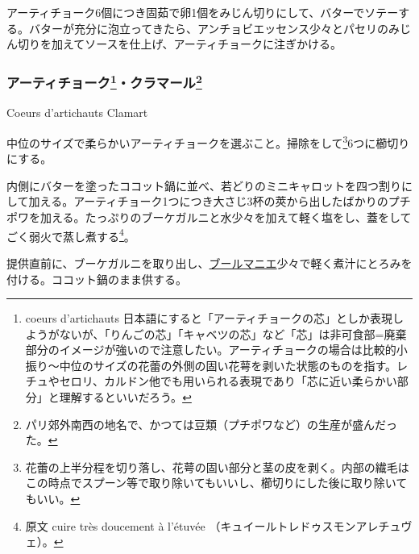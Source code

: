 \begin{recette}
アーティチョーク6個につき固茹で卵1個をみじん切りにして、バターでソテーする。バターが充分に泡立ってきたら、アンチョビエッセンス少々とパセリのみじん切りを加えてソースを仕上げ、アーティチョークに注ぎかける。

\atoaki{}

\hypertarget{coeurs-d-artichauts-clamart}{%
\subsubsection[アーティチョーク・クラマール]{\texorpdfstring{アーティチョーク\footnote{coeurs
  d'artichauts
  日本語にすると「アーティチョークの芯」としか表現しようがないが、「りんごの芯」「キャベツの芯」など「芯」は非可食部=廃棄部分のイメージが強いので注意したい。アーティチョークの場合は比較的小振り〜中位のサイズの花蕾の外側の固い花萼を剥いた状態のものを指す。レチュやセロリ、カルドン他でも用いられる表現であり「芯に近い柔らかい部分」と理解するといいだろう。}・クラマール\footnote{パリ郊外南西の地名で、かつては豆類（プチポワなど）の生産が盛んだった。}}{アーティチョーク・クラマール}}\label{coeurs-d-artichauts-clamart}}

\begin{frsubenv}

Coeurs d'artichauts Clamart

\end{frsubenv}


中位のサイズで柔らかいアーティチョークを選ぶこと。掃除をして\footnote{花蕾の上半分程を切り落し、花萼の固い部分と茎の皮を剥く。内部の繊毛はこの時点でスプーン等で取り除いてもいいし、櫛切りにした後に取り除いてもいい。}6つに櫛切りにする。

内側にバターを塗ったココット鍋に並べ、若どりのミニキャロットを四つ割りにして加える。アーティチョーク1つにつき大さじ3杯の莢から出したばかりのプチポワを加える。たっぷりのブーケガルニと水少々を加えて軽く塩をし、蓋をしてごく弱火で蒸し煮する\footnote{原文
  cuire très doucement à l'étuvée
  （キュイールトレドゥスモンアレチュヴェ）。}。

提供直前に、ブーケガルニを取り出し、\protect\hyperlink{beurre-manie}{ブールマニエ}少々で軽く煮汁にとろみを付ける。ココット鍋のまま供する。

\atoaki{}


\end{recette}
